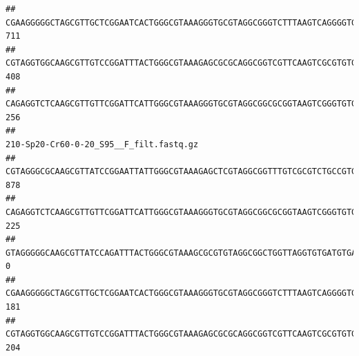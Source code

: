 \documentclass[]{article}
\begin{document}
\begin{verbatim}
## CGAAGGGGGCTAGCGTTGCTCGGAATCACTGGGCGTAAAGGGTGCGTAGGCGGGTCTTTAAGTCAGGGGTGAAATCCTGGAGCTCAACTCCAGAACTGCCTTTGATACTGAAGATCTTGAGTTCGGGAGAGGTGAGTGGAACTGCGAGTGTAGAGGTGAAATTCGTAGATATTCGCAAGAACACCAGTGGCGAAGGCGGCTCACTGGCCCGATACTGACGCTGAGGCACGAAAGCGTGGGGAGCAAACA                                     711
## CGTAGGTGGCAAGCGTTGTCCGGATTTACTGGGCGTAAAGAGCGCGCAGGCGGTCGTTCAAGTCGCGTGTGAAAGCCCCCGGCTCAACTGGGGAGGGTCACGCGATACTGATCGACTCGAAGGCAGGAGAGGGTAGTGGAATTCCCGGTGTAGTGGTGAAATGCGTAGATATCGGGAGGAACACCAGTGGCGAAGGCGACTACCTGGCCTGTTCTTGACGCTGAGGCGCGAAAGCTAGGGGAGCAAACG                                     408
## CAGAGGTCTCAAGCGTTGTTCGGATTCATTGGGCGTAAAGGGTGCGTAGGCGGCGCGGTAAGTCGGGTGTGAAATCTCGGGGCTTAACTCCGAAACTGCATTCGATACTGCCGTGCTTGAGGACTGGAGAGGAGACTGGAATTTACGGTGTAGCGGTGAAATGCGTAGATATCGTAAGGAAGACCAGTGGCGAAGGCGGGTCTCTGGACAGTTCCTGACGCTGAGGCACGAAGGCCAGGGGAGCAAACG                                     256
##                                                                                                                                                                                                                                                           210-Sp20-Cr60-0-20_S95__F_filt.fastq.gz
## CGTAGGGCGCAAGCGTTATCCGGAATTATTGGGCGTAAAGAGCTCGTAGGCGGTTTGTCGCGTCTGCCGTGAAAGTCCGGGGCTCAACTCCGGATCTGCGGTGGGTACGGGCAGACTAGAGTGATGTAGGGGAGACTGGAATTCCTGGTGTAGCGGTGAAATGCGCAGATATCAGGAGGAACACCGATGGCGAAGGCAGGTCTCTGGGCATTAACTGACGCTGAGGAGCGAAAGCATGGGGAGCGAACA                                     878
## CAGAGGTCTCAAGCGTTGTTCGGATTCATTGGGCGTAAAGGGTGCGTAGGCGGCGCGGTAAGTCGGGTGTGAAATCTCGGAGCTTAACTCCGAAACTGCATTCGATACTGCCGTGCTTGAGGACTGGAGAGGAGACTGGAATTTACGGTGTAGCGGTGAAATGCGTAGATATCGTAAGGAAGACCAGTGGCGAAGGCGGGTCTCTGGACAGTTCCTGACGCTGAGGCACGAAGGCCAGGGGAGCAAACG                                     225
## GTAGGGGGCAAGCGTTATCCAGATTTACTGGGCGTAAAGCGCGTGTAGGCGGCTGGTTAGGTGTGATGTGAAATCTTCCGGCTCAACCGGAAAACTGCATTGCAAACCGGCCTGGCTAGAGTGCAGGAGAGGGAAGCGGAATTCCAGGTGTAGCGGTGAAATGCGTAGATATCTGGAGGAACACCAGTGGCGAAGGCGGCTTCCTGGCCTGCAACTGACGCTGAGACGCGAAAGCGTGGGGAGCGAAC                                        0
## CGAAGGGGGCTAGCGTTGCTCGGAATCACTGGGCGTAAAGGGTGCGTAGGCGGGTCTTTAAGTCAGGGGTGAAATCCTGGAGCTCAACTCCAGAACTGCCTTTGATACTGAAGATCTTGAGTTCGGGAGAGGTGAGTGGAACTGCGAGTGTAGAGGTGAAATTCGTAGATATTCGCAAGAACACCAGTGGCGAAGGCGGCTCACTGGCCCGATACTGACGCTGAGGCACGAAAGCGTGGGGAGCAAACA                                     181
## CGTAGGTGGCAAGCGTTGTCCGGATTTACTGGGCGTAAAGAGCGCGCAGGCGGTCGTTCAAGTCGCGTGTGAAAGCCCCCGGCTCAACTGGGGAGGGTCACGCGATACTGATCGACTCGAAGGCAGGAGAGGGTAGTGGAATTCCCGGTGTAGTGGTGAAATGCGTAGATATCGGGAGGAACACCAGTGGCGAAGGCGACTACCTGGCCTGTTCTTGACGCTGAGGCGCGAAAGCTAGGGGAGCAAACG                                     204

\end{verbatim}
\end{document}
